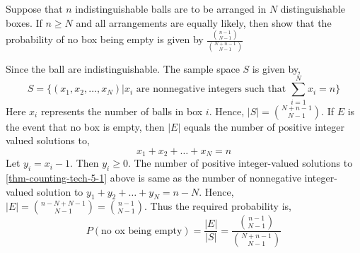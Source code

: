 \begin{example}
    Suppose that $n$ indistinguishable balls are to be arranged in $N$
distinguishable boxes. If $n \geq N$ and all arrangements are equally likely,
then show that the probability of no box being empty is given by
$\frac{{{n-1} \choose {N - 1}}}{{{N + n -1} \choose {N - 1}}}$
\end{example}
\begin{solution}
    Since the ball are indistinguishable. The sample space $S$ is given by,
    \begin{equation*}
        S = \lbrace (x_1, x_2, \dots, x_N) \vert x_i \text{ are nonnegative
                    integers such that } \sum_{i = 1}^N x_i = n \rbrace
    \end{equation*}
    Here $x_i$ represents the number of balls in box $i$. Hence, $\vert S
\vert = {{N + n - 1} \choose {N - 1}}$. If $E$ is the event that no box is
empty, then $\vert E \vert$ equals the number of positive integer valued
solutions to,
    \begin{equation}
        \label{thm-counting-tech-5-1}
        x_1 + x_2 + \dots + x_N = n
    \end{equation}
    Let $y_i = x_i - 1$. Then $y_i \geq 0$. The number of positive
integer-valued solutions to \ref{thm-counting-tech-5-1} above is same as the
number of nonnegative integer-valued solution to $y_1 + y_2 + \dots + y_N = n
- N$. Hence, $\vert E \vert = {{n -N + N - 1} \choose {N - 1}} = {{n - 1}
\choose {N - 1}}$. Thus the required probability is, 
    \begin{equation*}
          P(\text{no ox being empty}) 
        = \frac{\vert E \vert}{\vert S \vert}
        = \frac{{{n - 1}\choose {N - 1}}}{{{N + n - 1} \choose {N - 1}}}
    \end{equation*}
\end{solution}